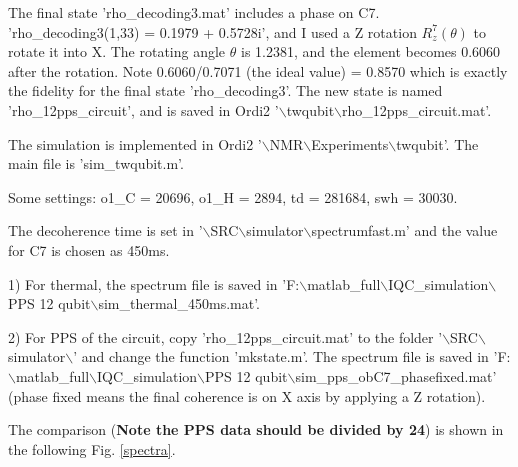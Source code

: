 \documentclass[prl,onecolumn]{revtex4-1}
\newcommand{\dir}{$\backslash$}
\begin{document}
The final state 'rho\_decoding3.mat' includes a phase on C7. 'rho\_decoding3(1,33) = 0.1979 + 0.5728i', and I used a Z rotation $R_z^7(\theta)$ to rotate it into X. The rotating angle $\theta$ is 1.2381, and the element becomes 0.6060 after the rotation. Note 0.6060/0.7071 (the ideal value) = 0.8570 which is exactly the fidelity for the final state 'rho\_decoding3'. The new state is named 'rho\_12pps\_circuit', and is saved in Ordi2 '\dir twqubit\dir rho\_12pps\_circuit.mat'.

The simulation is implemented in Ordi2 '\dir NMR\dir Experiments\dir twqubit'. The main file is 'sim\_twqubit.m'.

Some settings:
o1\_C = 20696, o1\_H = 2894, td = 281684, swh = 30030.

The decoherence time is set in '\dir SRC\dir simulator\dir spectrumfast.m' and the value for C7 is chosen as 450ms.

1) For thermal, the spectrum file is saved in 'F:\dir matlab\_full\dir IQC\_simulation\dir PPS 12 qubit\dir sim\_thermal\_450ms.mat'.

2) For PPS of the circuit, copy 'rho\_12pps\_circuit.mat' to the folder '\dir SRC\dir simulator\dir' and change the function 'mkstate.m'. The spectrum file is saved in 'F:\dir matlab\_full\dir IQC\_simulation\dir PPS 12 qubit\dir sim\_pps\_obC7\_phasefixed.mat' (phase fixed means the final coherence is on X axis by applying a Z rotation).

The comparison (\textbf{Note the PPS data should be divided by 24}) is shown in the following Fig. \ref{spectra}.
\end{document}

